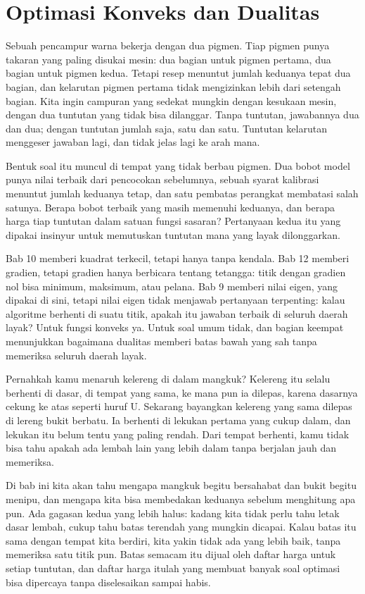 \chapter{Optimasi Konveks dan Dualitas}

Sebuah pencampur warna bekerja dengan dua pigmen. Tiap pigmen punya takaran yang paling
disukai mesin: dua bagian untuk pigmen pertama, dua bagian untuk pigmen kedua. Tetapi
resep menuntut jumlah keduanya tepat dua bagian, dan kelarutan pigmen pertama tidak
mengizinkan lebih dari setengah bagian. Kita ingin campuran yang sedekat mungkin dengan
kesukaan mesin, dengan dua tuntutan yang tidak bisa dilanggar. Tanpa tuntutan, jawabannya
dua dan dua; dengan tuntutan jumlah saja, satu dan satu. Tuntutan kelarutan menggeser
jawaban lagi, dan tidak jelas lagi ke arah mana.

Bentuk soal itu muncul di tempat yang tidak berbau pigmen. Dua bobot model punya nilai
terbaik dari pencocokan sebelumnya, sebuah syarat kalibrasi menuntut jumlah keduanya
tetap, dan satu pembatas perangkat membatasi salah satunya. Berapa bobot terbaik yang
masih memenuhi keduanya, dan berapa harga tiap tuntutan dalam satuan fungsi sasaran?
Pertanyaan kedua itu yang dipakai insinyur untuk memutuskan tuntutan mana yang layak
dilonggarkan.

Bab 10 memberi kuadrat terkecil, tetapi hanya tanpa kendala. Bab 12 memberi gradien, tetapi
gradien hanya berbicara tentang tetangga: titik dengan gradien nol bisa minimum, maksimum,
atau pelana. Bab 9 memberi nilai eigen, yang dipakai di sini, tetapi nilai eigen tidak
menjawab pertanyaan terpenting: kalau algoritme berhenti di suatu titik, apakah itu
jawaban terbaik di seluruh daerah layak? Untuk fungsi konveks ya. Untuk soal umum tidak,
dan bagian keempat menunjukkan bagaimana dualitas memberi batas bawah yang sah tanpa
memeriksa seluruh daerah layak.

\begin{untukanak}
Pernahkah kamu menaruh kelereng di dalam mangkuk? Kelereng itu selalu berhenti di dasar, di
tempat yang sama, ke mana pun ia dilepas, karena dasarnya cekung ke atas seperti huruf U.
Sekarang bayangkan kelereng yang sama dilepas di lereng bukit berbatu. Ia berhenti di
lekukan pertama yang cukup dalam, dan lekukan itu belum tentu yang paling rendah. Dari
tempat berhenti, kamu tidak bisa tahu apakah ada lembah lain yang lebih dalam tanpa
berjalan jauh dan memeriksa.

Di bab ini kita akan tahu mengapa mangkuk begitu bersahabat dan bukit begitu menipu, dan
mengapa kita bisa membedakan keduanya sebelum menghitung apa pun. Ada gagasan kedua yang
lebih halus: kadang kita tidak perlu tahu letak dasar lembah, cukup tahu batas terendah
yang mungkin dicapai. Kalau batas itu sama dengan tempat kita berdiri, kita yakin tidak
ada yang lebih baik, tanpa memeriksa satu titik pun. Batas semacam itu dijual oleh daftar
harga untuk setiap tuntutan, dan daftar harga itulah yang membuat banyak soal optimasi
bisa dipercaya tanpa diselesaikan sampai habis.
\end{untukanak}


